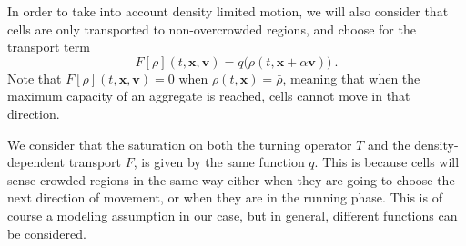 \documentclass{aims} %
\theoremstyle{definition}
\newcommand {\bv} { {\mathbf{v}} }
\newcommand {\bx} { {\mathbf{x}} }
\begin{document}
In order to take into account density limited motion, we will also consider that cells are only transported to non-overcrowded regions, and choose for the transport term
\begin{equation*}
F[\rho](t,\mathbf{x},\mathbf{v}) = q\big(\rho(t,\mathbf{x}+\alpha \mathbf{v})\big)\ .
\end{equation*}
Note that $F[\rho](t,\bx,\bv)=0$ when $\rho(t,\bx)=\bar{\rho}$, meaning that when the maximum capacity of an aggregate is reached, cells cannot move in that direction.

We consider that the saturation on both the turning operator $T$ and the density-dependent transport $F$, is given by the same function $q$. This is because cells will sense crowded regions in the same way either when they are going to choose the next direction of movement, or when they are in the running phase. This is of course a modeling assumption in our case, but in general, different functions can be considered.
\end{document}
